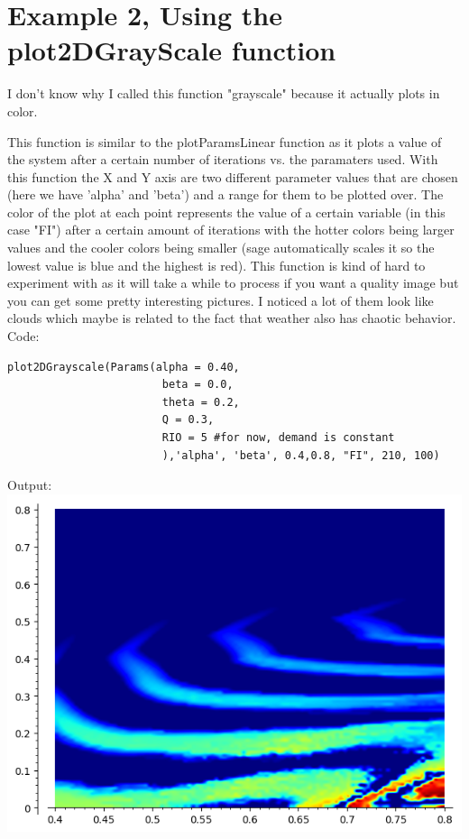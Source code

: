 \documentclass{article}
\begin{document}
\section*{Example 2, Using the plot2DGrayScale function}
I don't know why I called this function "grayscale" because it actually plots in color. 

This function is similar to the plotParamsLinear function as it plots a value of the system after a certain number of iterations vs. the paramaters used.
With this function the X and Y axis are two different parameter values that are chosen (here we have 'alpha' and 'beta') and a range for them to be plotted over.
The color of the plot at each point represents the value of a certain variable (in this case "FI") after a certain amount of iterations with the hotter colors 
being larger values and the cooler colors being smaller (sage automatically scales it so the lowest value is blue and the highest is red).
This function is kind of hard to experiment with as it will take a while to process if you want a quality image but you can get some pretty interesting pictures.
I noticed a lot of them look like clouds which maybe is related to the fact that weather also has chaotic behavior.
\linebreak
Code:
\begin{lstlisting}
plot2DGrayscale(Params(alpha = 0.40,
           			    beta = 0.0,
						theta = 0.2,
						Q = 0.3,
						RIO = 5 #for now, demand is constant
						),'alpha', 'beta', 0.4,0.8, "FI", 210, 100)
\end{lstlisting}
Output:
\linebreak
\includegraphics[scale=1.0]{example4_1.png}
\end{document}
